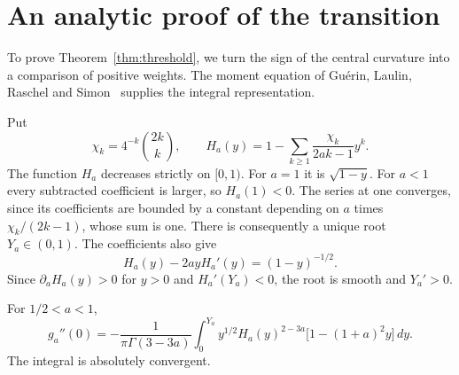 \section{An analytic proof of the transition}\label{app:analytic-threshold}

To prove Theorem~\ref{thm:threshold}, we turn the sign of the central
curvature into a comparison of positive weights. The moment equation
of Gu\'erin, Laulin, Raschel and Simon~\cite[(15)]{glrs2025}
supplies the integral representation.

Put
\begin{equation}\label{eq:an-H}
 \chi_k=4^{-k}\binom{2k}{k},\qquad
 H_a(y)=1-\sum_{k\ge1}\frac{\chi_k}{2ak-1}y^k.
\end{equation}
The function $H_a$ decreases strictly on $[0,1)$.
For $a=1$ it is $\sqrt{1-y}$. For $a<1$ every subtracted
coefficient is larger, so $H_a(1)<0$. The series at one converges,
since its coefficients are bounded by a constant depending on $a$
times $\chi_k/(2k-1)$, whose sum is one.
There is consequently a unique root $Y_a\in(0,1)$.
The coefficients also give
\begin{equation}\label{eq:an-H-ode}
 H_a(y)-2ayH_a'(y)=(1-y)^{-1/2}.
\end{equation}
Since $\partial_aH_a(y)>0$ for $y>0$ and $H_a'(Y_a)<0$,
the root is smooth and $Y_a'>0$.

\begin{lemma}\label{lem:curvature-weight}
For $1/2<a<1$,
\begin{equation}\label{eq:an-curvature}
 g_a''(0)=-\frac{1}{\pi\Gamma(3-3a)}
 \int_0^{Y_a}y^{1/2}H_a(y)^{2-3a}
             \bigl[1-(1+a)^2y\bigr]\,d y.
\end{equation}
The integral is absolutely convergent.
\end{lemma}

